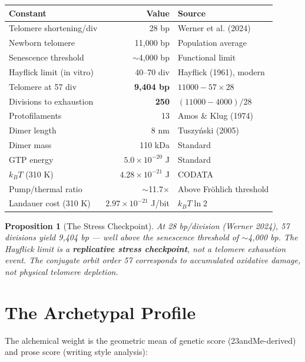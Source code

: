 \documentclass[12pt, letterpaper]{article}
\newtheorem{proposition}[theorem]{Proposition}
\begin{document}
\begin{center}
\begin{tabular}{lrl}
\toprule
\textbf{Constant} & \textbf{Value} & \textbf{Source} \\
\midrule
Telomere shortening/div & 28 bp & Werner et al. (2024) \\
Newborn telomere & 11,000 bp & Population average \\
Senescence threshold & $\sim$4,000 bp & Functional limit \\
Hayflick limit (in vitro) & 40--70 div & Hayflick (1961), modern \\
Telomere at 57 div & \textbf{9,404 bp} & $11000 - 57 \times 28$ \\
Divisions to exhaustion & \textbf{250} & $(11000 - 4000)/28$ \\
\midrule
Protofilaments & 13 & Amos \& Klug (1974) \\
Dimer length & 8 nm & Tuszy{\'n}ski (2005) \\
Dimer mass & 110 kDa & Standard \\
\midrule
GTP energy & $5.0 \times 10^{-20}$ J & Standard \\
$k_BT$ (310 K) & $4.28 \times 10^{-21}$ J & CODATA \\
Pump/thermal ratio & $\sim$11.7$\times$ & Above Fr\"{o}hlich threshold \\
\midrule
Landauer cost (310 K) & $2.97 \times 10^{-21}$ J/bit & $k_BT \ln 2$ \\
\bottomrule
\end{tabular}
\end{center}

\begin{proposition}[The Stress Checkpoint]
At 28 bp/division (Werner 2024), 57 divisions yield 9,404 bp --- well above the senescence threshold of $\sim$4,000 bp. The Hayflick limit is a \textbf{replicative stress checkpoint}, not a telomere exhaustion event. The conjugate orbit order 57 corresponds to accumulated oxidative damage, not physical telomere depletion.
\end{proposition}

\section{The Archetypal Profile}

The alchemical weight is the geometric mean of genetic score (23andMe-derived) and prose score (writing style analysis):
\end{document}
